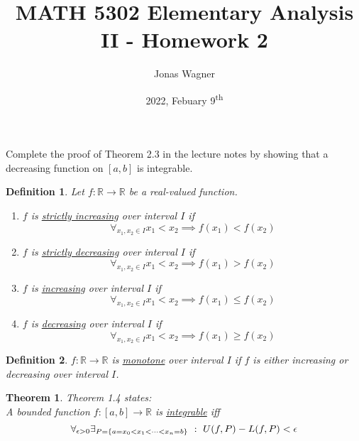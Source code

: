\documentclass[]{article}
\title{MATH 5302 Elementary Analysis II - Homework 2}
\author{Jonas Wagner}
\date{2022, Febuary 9\textsuperscript{th}}
\newcommand{\R}{\mathbb{R}}
\newcommand{\st}{\ : \ }
\newtheorem{definition}{Definition}
\newtheorem{theorem}{Theorem}
\begin{document}
\maketitle

\section{}
Complete the proof of Theorem 2.3 in the lecture notes by showing that a decreasing function on $[a,b]$ is integrable.

\begin{definition}\label{def:increasingAndDecreasing}
    Let $f : \R \to \R$ be a real-valued function.
    \begin{enumerate}
        \item $f$ is \underline{\emph{strictly increasing}} over interval $I$ if\[
            \forall_{x_1, x_2\in I} x_1 < x_2 \implies f(x_1) < f(x_2)  
            \]
        \item $f$ is \underline{\emph{strictly decreasing}} over interval $I$ if\[
            \forall_{x_1, x_2\in I} x_1 < x_2 \implies f(x_1) > f(x_2)  
            \]
        \item $f$ is \underline{\emph{increasing}} over interval $I$ if\[
            \forall_{x_1, x_2\in I} x_1 < x_2 \implies f(x_1) \leq f(x_2)  
            \]
        \item $f$ is \underline{\emph{decreasing}} over interval $I$ if\[
            \forall_{x_1, x_2\in I} x_1 < x_2 \implies f(x_1) \geq f(x_2)  
            \]
    \end{enumerate}
\end{definition}

\begin{definition}
    $f : \R \to \R$ is \underline{\emph{monotone}} over interval $I$ if $f$ is either increasing or decreasing over interval $I$.
\end{definition}

\begin{theorem}
    Theorem 1.4 states:\\
    A bounded function $f : [a,b] \to \R$ is \underline{\emph{integrable}} iff \[
        \forall_{\epsilon>0} 
        \exists_{P = \qty{a=x_0<x_1<\dots<x_n=b}} 
        \st U(f,P) - L(f,P) < \epsilon
    \]
\end{theorem}
\end{document}
